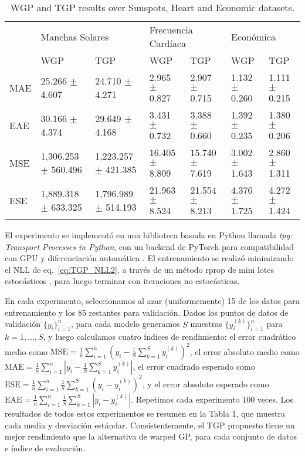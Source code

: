 \begin{table}
	\centering
	\tiny
	\begin{tabular}{l|ll|ll|ll}
		\toprule
		{} & \multicolumn{2}{l}{Manchas Solares} & \multicolumn{2}{l}{Frecuencia Cardíaca} & \multicolumn{2}{l}{Económica} \\
		{} &                      WGP &                      TGP &                 WGP &                 TGP &                WGP &                TGP \\
		\midrule
		MAE &       25.266 \(\pm\) 4.607 &       24.710 \(\pm\) 4.271 &   2.965 \(\pm\) 0.827 &   2.907 \(\pm\) 0.715 &  1.132 \(\pm\) 0.260 &  1.111 \(\pm\) 0.215 \\
		EAE &       30.166 \(\pm\) 4.374 &       29.649 \(\pm\) 4.168 &   3.431 \(\pm\) 0.732 &   3.388 \(\pm\) 0.660 &  1.392 \(\pm\) 0.235 &  1.380 \(\pm\) 0.206 \\
		MSE &  1,306.253 \(\pm\) 560.496 &  1,223.257 \(\pm\) 421.385 &  16.405 \(\pm\) 8.809 &  15.740 \(\pm\) 7.619 &  3.002 \(\pm\) 1.643 &  2.860 \(\pm\) 1.311 \\
		ESE &  1,889.318 \(\pm\) 633.325 &  1,796.989 \(\pm\) 514.193 &  21.963 \(\pm\) 8.524 &  21.554 \(\pm\) 8.213 &  4.376 \(\pm\) 1.725 &  4.272 \(\pm\) 1.424 \\
		\bottomrule
	\end{tabular}
	\vspace{0.5em}
	\caption{WGP and TGP results over Sunspots, Heart and Economic datasets.}
	\label{tab:table_results} 
\end{table}


El experimento se implementó en una biblioteca basada en Python llamada \emph{tpy: Transport Processes in Python}\cite{tpy}, con un backend de PyTorch para compatibilidad con GPU y diferenciación automática \cite{paszke2017automatic}. El entrenamiento se realizó minimizando el NLL de eq.~\eqref{eq:TGP_NLL2}, a través de un método rprop de mini lotes estocásticos \cite{riedmiller1993direct}, para luego terminar con iteraciones no estocásticas.

En cada experimento, seleccionamos al azar (uniformemente) 15\text{\%} de los datos para entrenamiento y los 85\text{\%} restantes para validación. Dados los puntos de datos de validación \(\{y_i\}_{i=1}^n\), para cada modelo generamos \(S\) muestras \(\{y_i^{(k)}\}_{i=1}^n \) para \(k=1,...,S\), y luego calculamos cuatro índices de rendimiento: el error cuadrático medio como \(\text{MSE} = \frac{1}{n}\sum\limits_{i=1 }^{n}\left(y_{i} - \frac{1}{S}\sum_{k=1}^{S}y_i^{(k)}\right)^2\), el error absoluto medio como \(\text{MAE} = \frac{1}{n}\sum\limits_{i=1}^{n}|y_{i} - \frac{1}{S}\sum_{k=1} ^{S}y_i^{(k)}|\), el error cuadrado esperado como \(\text{ESE} = \frac{1}{n}\sum\limits_{i=1}^{n}\frac{ 1}{S}\sum_{k=1}^{S}(y_{i} - y_{i}^{(k)})^2\), y el error absoluto esperado como \(\text{EAE} = \frac{1}{n}\sum\limits_{i=1}^{n}\frac{1}{S}\sum_{k=1}^{S}|y_{i} - y_{i} ^{(k)}|\). Repetimos cada experimento 100 veces. Los resultados de todos estos experimentos se resumen en la Tabla 1, que muestra cada media y desviación estándar. Consistentemente, el TGP propuesto tiene un mejor rendimiento que la alternativa de warped GP, para cada conjunto de datos e índice de evaluación.

